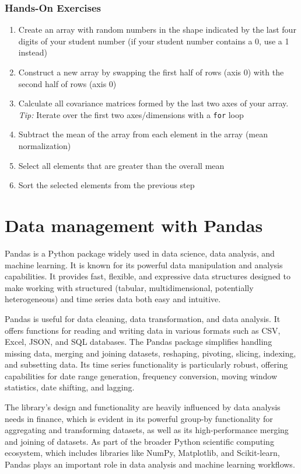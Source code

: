 \begin{tcolorbox}[colback=code]
\subsubsection*{Hands-On Exercises}
\begin{enumerate}
   \item Create an array with random numbers in the shape indicated by the last four digits of your student number (if your student number contains a 0, use a 1 instead)
   \item Construct a new array by swapping the first half of rows (axis 0) with the second half of rows (axis 0)
   \item Calculate all covariance matrices formed by the last two axes of your array. \emph{Tip:} Iterate over the first two axes/dimensions with a \texttt{for} loop
   \item Subtract the mean of the array from each element in the array (mean normalization)
   \item Select all elements that are greater than the overall mean
   \item Sort the selected elements from the previous step
\end{enumerate}
\end{tcolorbox}

\section{Data management with Pandas}

Pandas is a Python package widely used in data science, data analysis, and machine learning. It is known for its powerful data manipulation and analysis capabilities. It provides fast, flexible, and expressive data structures designed to make working with structured (tabular, multidimensional, potentially heterogeneous) and time series data both easy and intuitive. 

Pandas is useful for data cleaning, data transformation, and data analysis. It offers functions for reading and writing data in various formats such as CSV, Excel, JSON, and SQL databases. The Pandas package simplifies handling missing data, merging and joining datasets, reshaping, pivoting, slicing, indexing, and subsetting data. Its time series functionality is particularly robust, offering capabilities for date range generation, frequency conversion, moving window statistics, date shifting, and lagging.

The library's design and functionality are heavily influenced by data analysis needs in finance, which is evident in its powerful group-by functionality for aggregating and transforming datasets, as well as its high-performance merging and joining of datasets. As part of the broader Python scientific computing ecosystem, which includes libraries like NumPy, Matplotlib, and Scikit-learn, Pandas plays an important role in data analysis and machine learning workflows.

